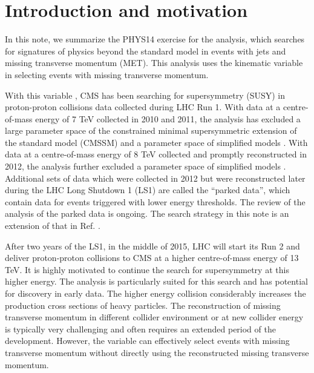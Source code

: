\section{Introduction and motivation}
\label{sec:intro}

In this note, we summarize the PHYS14 exercise \cite{PHYS14} for the
\alphat analysis, which searches for signatures of physics beyond the
standard model in events with jets and missing transverse momentum
(MET). This analysis uses the kinematic variable \alphat in selecting
events with missing transverse momentum.



With this variable \alphat, CMS has been searching for supersymmetry
(SUSY) in proton-proton collisions data collected during LHC Run 1. With
data at a centre-of-mass energy of 7 TeV collected in 2010 and 2011, the
\alphat analysis has excluded a large parameter space of the constrained
minimal supersymmetric extension of the standard model (CMSSM)
\cite{Khachatryan:2011tk, Chatrchyan:2011zy, Chatrchyan:2012wa} and a
parameter space of simplified models \cite{Chatrchyan:2012wa}. With data
at a centre-of-mass energy of 8 TeV collected and promptly reconstructed
in 2012, the \alphat analysis further excluded a parameter space of
simplified models \cite{Chatrchyan:2013lya}. Additional sets of data
which were collected in 2012 but were reconstructed later during the LHC
Long Shutdown 1 (LS1) are called the ``parked data'', which contain data
for events triggered with lower energy thresholds. The review of the
\alphat analysis of the parked data \cite{CMS_AN_2013-366} is ongoing.
The search strategy in this note is an extension of that in Ref.
\cite{CMS_AN_2013-366}.

After two years of the LS1, in the middle of 2015, LHC will start its
Run 2 and deliver proton-proton collisions to CMS at a higher
centre-of-mass energy of 13 TeV. It is highly motivated to continue the
search for supersymmetry at this higher energy. The \alphat analysis is
particularly suited for this search and has potential for discovery in
early data. The higher energy collision considerably increases the
production cross sections of heavy particles. The reconstruction of
missing transverse momentum in different collider environment or at new
collider energy is typically very challenging and often requires an
extended period of the development. However, the variable \alphat can
effectively select events with missing transverse momentum without
directly using the reconstructed missing transverse momentum.

